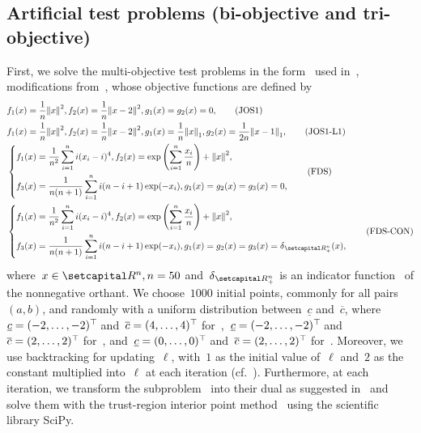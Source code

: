 \documentclass[../main]{subfiles}
\begin{document}
\subsection{Artificial test problems (bi-objective and tri-objective)}
First, we solve the multi-objective test problems in the form~ used in~\cite{Tanabe2022a}, modifications from~\cite{Jin2001,Fliege2009}, whose objective functions are defined by
\begin{align}
    &f_1(x) = \frac{1}{n} \norm*{x}^2,
    f_2(x) = \frac{1}{n} \norm*{x - 2}^2,
    g_1(x) = g_2(x) = 0, \tag{JOS1}\label{eq:JOS1} \\
    &f_1(x) = \frac{1}{n} \norm*{x}^2,
    f_2(x) = \frac{1}{n} \norm*{x - 2}^2,
    g_1(x) = \frac{1}{n} \norm*{x}_1,
    g_2(x) = \frac{1}{2n} \norm*{x - 1}_1,
    \label{eq:JOS1_L1} \tag{JOS1-L1}\\
    &\left\{\begin{aligned} 
            f_1(x) &= \frac{1}{n^2} \sum_{i = 1}^{n} i (x_i - i)^4,
            f_2(x) = \exp \left( \sum_{i = 1}^{n} \frac{x_i}{n} \right) + \norm*{x}^2,\\
            f_3(x) &= \frac{1}{n (n + 1)} \sum_{i = 1}^{n} i (n - i + 1) \exp (- x_i),
            g_1(x) = g_2(x) = g_3(x) = 0,
    \end{aligned} \right. \label{eq:FDS} \tag{FDS}\\
    &\left\{\begin{aligned} 
            f_1(x) &= \frac{1}{n^2} \sum_{i = 1}^{n} i (x_i - i)^4,
            f_2(x) = \exp \left( \sum_{i = 1}^{n} \frac{x_i}{n} \right) + \norm*{x}^2,\\
            f_3(x) &= \frac{1}{n (n + 1)} \sum_{i = 1}^{n} i (n - i + 1) \exp (- x_i),
            g_1(x) = g_2(x) = g_3(x) = \indicator_{\setRpos^n}(x),
    \end{aligned} \right.\label{eq:FDS_CONSTRAINED} \tag{FDS-CON}
\end{align}
where~$x \in \setR^n, n = 50$ and~$\indicator_{\setRpos^n}$ is an indicator function~ of the nonnegative orthant.
We choose~$1000$ initial points, commonly for all pairs~$(a, b)$, and randomly with a uniform distribution between~$\underline{c}$ and~$\overline{c}$, where~$\underline{c} = (-2, \dots, -2)^\top\hspace{-1pt}$ and~$\overline{c} = (4, \dots, 4)^\top\hspace{-1pt}$ for~,~$\underline{c} = (-2, \dots, -2)^\top\hspace{-1pt}$ and~$\overline{c} = (2, \dots, 2)^\top\hspace{-1pt}$ for~, and~$\underline{c} = (0, \dots, 0)^\top\hspace{-1pt}$ and~$\overline{c} = (2, \dots, 2)^\top\hspace{-1pt}$ for~.
Moreover, we use backtracking for updating~$\ell$, with~$1$ as the initial value of~$\ell$ and~$2$ as the constant multiplied into~$\ell$ at each iteration (cf.~\cite[Remark~4.1~(v)]{Tanabe2022a}).
Furthermore, at each iteration, we transform the subproblem~ into their dual as suggested in~\cite{Tanabe2022a} and solve them with the trust-region interior point method~\cite{Byrd1999} using the scientific library SciPy.
\end{document}
